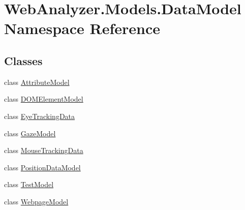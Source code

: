 \hypertarget{namespace_web_analyzer_1_1_models_1_1_data_model}{}\section{Web\+Analyzer.\+Models.\+Data\+Model Namespace Reference}
\label{namespace_web_analyzer_1_1_models_1_1_data_model}
\subsection*{Classes}
\begin{DoxyCompactItemize}
\item 
class \hyperlink{class_web_analyzer_1_1_models_1_1_data_model_1_1_attribute_model}{Attribute\+Model}
\item 
class \hyperlink{class_web_analyzer_1_1_models_1_1_data_model_1_1_d_o_m_element_model}{D\+O\+M\+Element\+Model}
\item 
class \hyperlink{class_web_analyzer_1_1_models_1_1_data_model_1_1_eye_tracking_data}{Eye\+Tracking\+Data}
\item 
class \hyperlink{class_web_analyzer_1_1_models_1_1_data_model_1_1_gaze_model}{Gaze\+Model}
\item 
class \hyperlink{class_web_analyzer_1_1_models_1_1_data_model_1_1_mouse_tracking_data}{Mouse\+Tracking\+Data}
\item 
class \hyperlink{class_web_analyzer_1_1_models_1_1_data_model_1_1_position_data_model}{Position\+Data\+Model}
\item 
class \hyperlink{class_web_analyzer_1_1_models_1_1_data_model_1_1_test_model}{Test\+Model}
\item 
class \hyperlink{class_web_analyzer_1_1_models_1_1_data_model_1_1_webpage_model}{Webpage\+Model}
\end{DoxyCompactItemize}
